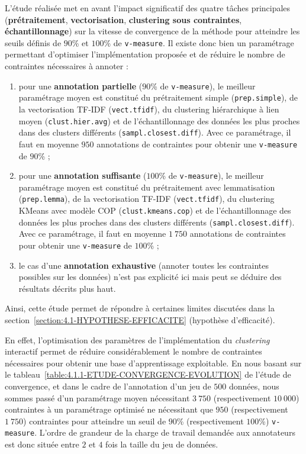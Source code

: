 			L'étude réalisée met en avant l'impact significatif des quatre tâches principales (\textbf{prétraitement}, \textbf{vectorisation}, \textbf{clustering sous contraintes}, \textbf{échantillonnage}) sur la vitesse de convergence de la méthode pour atteindre les seuils définis de $90$\% et $100$\% de \texttt{v-measure}. Il existe donc bien un paramétrage permettant d'optimiser l'implémentation proposée et de réduire le nombre de contraintes nécessaires à annoter :
			\begin{enumerate}
				\item pour une \textbf{annotation partielle} ($90$\% de \texttt{v-measure}), le meilleur paramétrage moyen est constitué du prétraitement simple (\texttt{prep.simple}), de la vectorisation TF-IDF (\texttt{vect.tfidf}), du clustering hiérarchique à lien moyen (\texttt{clust.hier.avg}) et de l'échantillonnage des données les plus proches dans des clusters différents (\texttt{sampl.closest.diff}). Avec ce paramétrage, il faut en moyenne $950$ annotations de contraintes pour obtenir une \texttt{v-measure} de $90$\% ;
				\item pour une \textbf{annotation suffisante} ($100$\% de \texttt{v-measure}), le meilleur paramétrage moyen est constitué du prétraitement avec lemmatisation (\texttt{prep.lemma}), de la vectorisation TF-IDF (\texttt{vect.tfidf}), du clustering KMeans avec modèle COP (\texttt{clust.kmeans.cop}) et de l'échantillonnage des données les plus proches dans des clusters différents (\texttt{sampl.closest.diff}). Avec ce paramétrage, il faut en moyenne $1~750$ annotations de contraintes pour obtenir une \texttt{v-measure} de $100$\% ;
				\item le cas d'une \textbf{annotation exhaustive} (annoter toutes les contraintes possibles sur les données) n'est pas explicité ici mais peut se déduire des résultats décrits plus haut.
			\end{enumerate}


			Ainsi, cette étude permet de répondre à certaines limites discutées dans la section~\ref{section:4.1-HYPOTHESE-EFFICACITE} (hypothèse d'efficacité). 
			
			En effet, l'optimisation des paramètres de l'implémentation du \textit{clustering} interactif permet de réduire considérablement le nombre de contraintes nécessaires pour obtenir une base d'apprentissage exploitable.
			En nous basant sur le tableau~\ref{table:4.1.1-ETUDE-CONVERGENCE-EVOLUTION} de l'étude de convergence, et dans le cadre de l'annotation d'un jeu de $500$ données, nous sommes passé d'un paramétrage moyen nécessitant $3~750$ (respectivement $10~000$) contraintes à un paramétrage optimisé ne nécessitant que $950$ (respectivement $1~750$) contraintes pour atteindre un seuil de $90$\% (respectivement $100$\%) \texttt{v-measure}.
			L'ordre de grandeur de la charge de travail demandée aux annotateurs est donc située entre $2$ et $4$ fois la taille du jeu de données.
			
